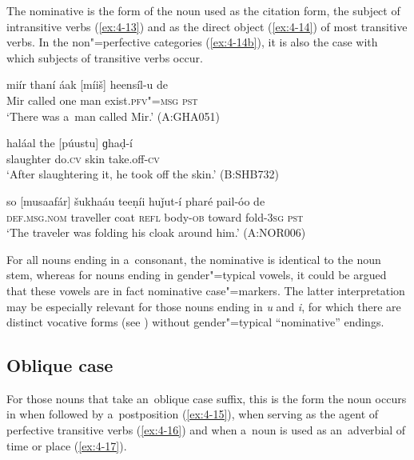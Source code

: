 The nominative is the form of the noun used as the citation form, the subject of intransitive verbs (\ref{ex:4-13}) and as the direct object (\ref{ex:4-14}) of most transitive verbs. In the non"=perfective categories (\ref{ex:4-14b}), it is also the case with which subjects of transitive verbs occur. 


\begin{exe}
\ex
\label{ex:4-13}
\gll miír thaní áak [míiš] heensíl-u de\\
	Mir called one man exist.\textsc{pfv"=msg} \textsc{pst}\\
\glt `There was a~man called Mir.' (A:GHA051)
\end{exe}

\begin{exe}
\ex
\label{ex:4-14}
\gll haláal the [púustu] ɡhaḍ-í \\
	slaughter do.\textsc{cv} skin take.off-\textsc{cv} \\
\glt `After slaughtering it, he took off the skin.' (B:SHB732)
\end{exe}

\begin{exe}
\ex
\label{ex:4-14b}
\gll so [musaafár] šukhaáu teeṇíi huǰut-í pharé pail-óo de \\
	\textsc{def.msg.nom} traveller coat \textsc{refl} body-\textsc{ob} toward fold-\textsc{3sg} \textsc{pst} \\
\glt `The traveler was folding his cloak around him.' (A:NOR006)
\end{exe}


For all nouns ending in a~consonant, the nominative is identical to the noun stem, whereas for nouns ending in gender"=typical vowels, it could be argued that these vowels are in fact nominative case"=markers. The latter interpretation may be especially relevant for those nouns ending in \textit{u} and \textit{i}, for which there are distinct vocative forms (see ) without gender"=typical ``nominative'' endings.

\subsection{Oblique case}
\label{subsec:4-5-2}

For those nouns that take an~oblique case suffix, this is the form the noun occurs in when followed by a~postposition (\ref{ex:4-15}), when serving as the agent of perfective transitive verbs (\ref{ex:4-16}) and when a~noun is used as an~adverbial of time or place (\ref{ex:4-17}). 


